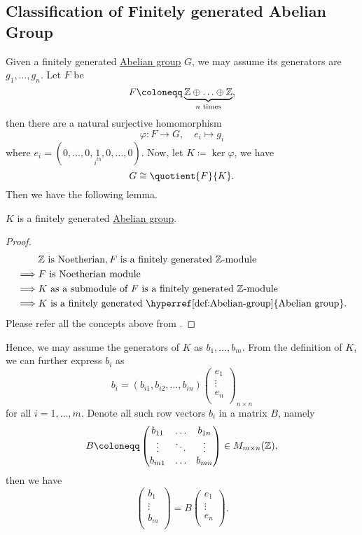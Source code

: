 \subsection{Classification of Finitely generated Abelian Group}
Given a finitely generated \hyperref[def:Abelian-group]{Abelian group} \(G\), we may assume its generators are \(g_1, \ldots , g_n \). Let \(F\) be
\[
	F\coloneqq \underbrace{\mathbb{\MakeUppercase{z}} \oplus \ldots \oplus \mathbb{\MakeUppercase{z}}  }_{n \text{ times}},
\]
then there are a natural surjective homomorphism
\[
	\varphi \colon F\to G,\quad e_{i} \mapsto g_{i}
\]
where \(e_{i} = (0, \ldots , 0, \underset{i^{th} }{1}, 0, \ldots , 0  )\). Now, let \(K\coloneqq \ker \varphi  \), we have
\[
	G \cong \quotient{F}{K}.
\]
Then we have the following lemma.
\begin{lemma}
	\(K\) is a finitely generated \hyperref[def:Abelian-group]{Abelian group}.
\end{lemma}
\begin{proof}
	\[
		\begin{split}
			&\mathbb{\MakeUppercase{z}} \text{ is Noetherian}, F \text{ is a finitely generated \(\mathbb{Z}\)-module }  \\
			\implies &F \text{ is Noetherian module}\\
			\implies &\text{\(K\) as a submodule of \(F\) is a finitely generated \(\mathbb{Z}\)-module } \\
			\implies &\text{\(K\) is a finitely generated \hyperref[def:Abelian-group]{Abelian group}}.
		\end{split}
	\]
	Please refer all the concepts above from \cite{atiyah1994introduction}.
\end{proof}

Hence, we may assume the generators of \(K\) as \(b_1, \ldots , b_{m}\). From the definition of \(K\), we can further express \(b_{i}\) as
\[
	b_{i} = (b_{i1}, b_{i2}, \ldots , b_{in})\begin{pmatrix}
		e_{1}  \\
		\vdots \\
		e_{n}  \\
	\end{pmatrix}_{n \times n}
\]
for all \(i = 1, \ldots , m \). Denote all such row vectors \(b_{i} \) in a matrix \(B\), namely
\[
	B \coloneqq \begin{pmatrix}
		b_{11} & \ldots & b_{1n} \\
		\vdots & \ddots & \vdots \\
		b_{m1} & \ldots & b_{mn} \\
	\end{pmatrix}\in M_{m\times n} ({\mathbb{\MakeUppercase{z}} }),
\]
then we have
\[
	\begin{pmatrix}
		b_1    \\
		\vdots \\
		b_m    \\
	\end{pmatrix} = B\begin{pmatrix}
		e_{1}  \\
		\vdots \\
		e_{n}  \\
	\end{pmatrix}.
\]

